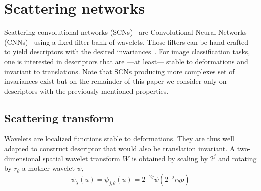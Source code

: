 \documentclass{article}
\begin{document}
  

\section{Scattering networks}
  \label{sec:SCN}


    Scattering convolutional networks (SCNs)~\citep{bruna} are Convolutional Neural Networks (CNNs)~\citet{lecun1995convolutional} using a fixed filter bank of wavelets. Those filters can be hand-crafted to yield descriptors with the desired invariances~\citep{work translation invariant, work rotation invariant, work rigid motion}. For image classification tasks, one is interested in descriptors that are ---at least--- stable to deformations and invariant to translations. Note that SCNs producing more complexes set of invariances exist but on the remainder of this paper we consider only on descriptors with the previously mentioned properties.

  
  \subsection{Scattering transform}
    \label{subsec:SCN/ST}
    
    Wavelets are localized functions stable to deformations. They are thus well adapted to construct descriptor that would also be translation invariant. A two-dimensional spatial wavelet transform $W$ is obtained by scaling by $2^{j}$ and rotating by $r_{\theta}$ a mother wavelet $\psi$,
    \vspace{-5pt}
    \begin{equation}
      \label{eq:multi-scale directional wavelet}
      \psi_{\lambda}(u) = \psi_{j,\theta}(u) = 2^{-2j} \psi(2^{-j}r_{\theta}p)
    \end{equation}
    
\end{document}
